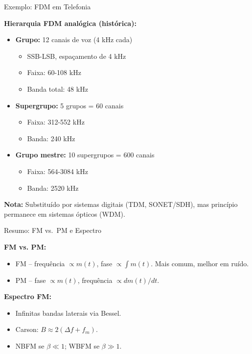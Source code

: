 
\begin{frame}{Exemplo: FDM em Telefonia}

\textbf{Hierarquia FDM analógica (histórica):}

\begin{itemize}
\item \textbf{Grupo:} 12 canais de voz (4 kHz cada)
  \begin{itemize}
  \item SSB-LSB, espaçamento de 4 kHz
  \item Faixa: 60-108 kHz
  \item Banda total: 48 kHz
  \end{itemize}

\item \textbf{Supergrupo:} 5 grupos = 60 canais
  \begin{itemize}
  \item Faixa: 312-552 kHz
  \item Banda: 240 kHz
  \end{itemize}

\item \textbf{Grupo mestre:} 10 supergrupos = 600 canais
  \begin{itemize}
  \item Faixa: 564-3084 kHz
  \item Banda: 2520 kHz
  \end{itemize}
\end{itemize}

\vspace{0.3cm}

\textbf{Nota:} Substituído por sistemas digitais (TDM, SONET/SDH), mas princípio permanece em sistemas ópticos (WDM).

\end{frame}


\begin{frame}{Resumo: FM vs.\ PM e Espectro}

\textbf{FM vs. PM:}
\begin{itemize}\itemsep0pt
\item FM -- frequência $\propto m(t)$, fase $\propto \int m(t)$. Mais comum, melhor em ruído.
\item PM -- fase $\propto m(t)$, frequência $\propto dm(t)/dt$.
\end{itemize}

\vspace{0.3cm}
\textbf{Espectro FM:}
\begin{itemize}\itemsep0pt
\item Infinitas bandas laterais via Bessel.
\item Carson: $B \approx 2(\Delta f + f_m)$.
\item NBFM se $\beta \ll 1$; WBFM se $\beta \gg 1$.
\end{itemize}

\end{frame}

